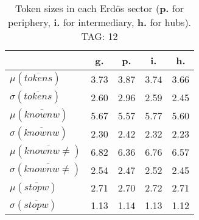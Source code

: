 \begin{table}[h!]
\begin{center}
\begin{tabular}{| l | c | c | c | c |}\hline
 & g. & p. & i. & h. \\\hline
$\mu(\overline{tokens})$ & 3.73  & 3.87  & 3.74  & 3.66 \\\hline
$\sigma(\overline{tokens})$ & 2.60  & 2.96  & 2.59  & 2.45 \\\hline
$\mu(\overline{knownw})$ & 5.67  & 5.57  & 5.77  & 5.60 \\\hline
$\sigma(\overline{knownw})$ & 2.30  & 2.42  & 2.32  & 2.23 \\\hline
$\mu(\overline{knownw \neq})$ & 6.82  & 6.36  & 6.76  & 6.57 \\\hline
$\sigma(\overline{knownw \neq})$ & 2.54  & 2.47  & 2.52  & 2.45 \\\hline
$\mu(\overline{stopw})$ & 2.71  & 2.70  & 2.72  & 2.71 \\\hline
$\sigma(\overline{stopw})$ & 1.13  & 1.14  & 1.13  & 1.12 \\\hline
\end{tabular}
\caption{Token sizes in each Erd\"os sector ({{\bf p.}} for periphery, {{\bf i.}} for intermediary, {{\bf h.}} for hubs). TAG: 12}
\end{center}
\end{table}